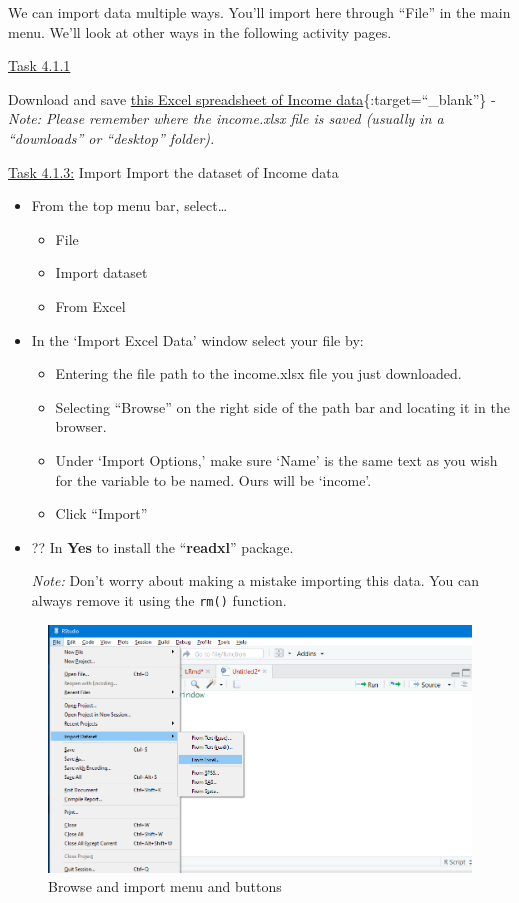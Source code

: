 \documentclass[
]{article}
\begin{document}
We can import data multiple ways. You'll import here through ``File'' in
the main menu. We'll look at other ways in the following activity pages.

\ul{Task 4.1.1}

Download and save \href{docs/income.xlsx}{this Excel spreadsheet of
Income data}\{:target=``\_blank''\} - \emph{Note: Please remember where
the income.xlsx file is saved (usually in a ``downloads'' or ``desktop''
folder).}

\ul{Task 4.1.3:} Import Import the dataset of Income data

\begin{itemize}
\item
  From the top menu bar, select\ldots{}

  \begin{itemize}
  \item
    File
  \item
    Import dataset
  \item
    From Excel
  \end{itemize}
\item
  In the `Import Excel Data' window select your file by:

  \begin{itemize}
  \item
    Entering the file path to the income.xlsx file you just downloaded.
  \item
    Selecting ``Browse'' on the right side of the path bar and locating
    it in the browser.
  \item
    Under `Import Options,' make sure `Name' is the same text as you
    wish for the variable to be named. Ours will be `income'.
  \item
    Click ``Import''
  \end{itemize}
\item
  ?? In \textbf{Yes} to install the ``\textbf{readxl}'' package.

  \emph{Note:} Don't worry about making a mistake importing this data.
  You can always remove it using the \texttt{rm()} function.
\end{itemize}

\begin{figure}
\centering
\includegraphics{images/rstudio-15.png}
\caption{Browse and import menu and buttons}
\end{figure}
\end{document}
